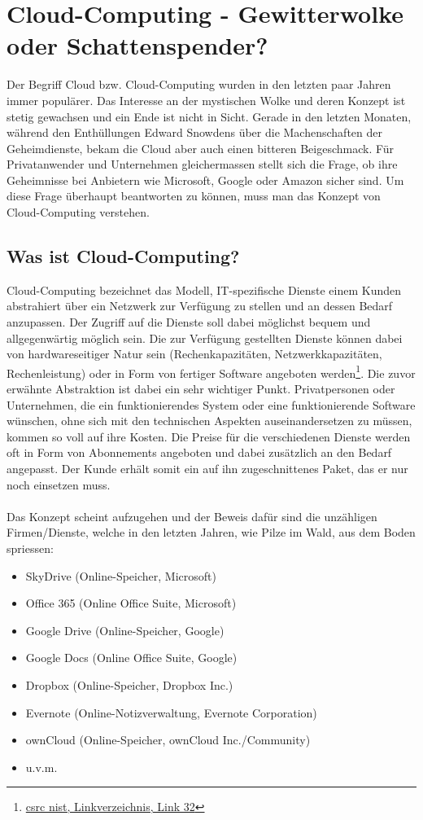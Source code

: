 \section{Cloud-Computing - Gewitterwolke oder Schattenspender?}
Der Begriff Cloud bzw. Cloud-Computing wurden in den letzten paar Jahren immer populärer. Das Interesse an der mystischen Wolke und deren Konzept ist stetig gewachsen und ein Ende ist nicht in Sicht. Gerade in den letzten Monaten, während den Enthüllungen Edward Snowdens über die Machenschaften der Geheimdienste, bekam die Cloud aber auch einen bitteren Beigeschmack. Für Privatanwender und Unternehmen gleichermassen stellt sich die Frage, ob ihre Geheimnisse bei Anbietern wie Microsoft, Google oder Amazon sicher sind. Um diese Frage überhaupt beantworten zu können, muss man das Konzept von Cloud-Computing verstehen.

\subsection{Was ist Cloud-Computing?}
Cloud-Computing bezeichnet das Modell, IT-spezifische Dienste einem Kunden abstrahiert über ein Netzwerk zur Verfügung zu stellen und an dessen Bedarf anzupassen. Der Zugriff auf die Dienste soll dabei möglichst bequem und allgegenwärtig möglich sein. Die zur Verfügung gestellten Dienste können dabei von hardwareseitiger Natur sein (Rechenkapazitäten, Netzwerkkapazitäten, Rechenleistung) oder in Form von fertiger Software angeboten werden\footnote{\hyperlink{link32}{csrc nist, Linkverzeichnis, Link 32}}.
Die zuvor erwähnte Abstraktion ist dabei ein sehr wichtiger Punkt. Privatpersonen oder Unternehmen, die ein funktionierendes System oder eine funktionierende Software wünschen, ohne sich mit den technischen Aspekten auseinandersetzen zu müssen, kommen so voll auf ihre Kosten. Die Preise für die verschiedenen Dienste werden oft in Form von Abonnements angeboten und dabei zusätzlich an den Bedarf angepasst. Der Kunde erhält somit ein auf ihn zugeschnittenes Paket, das er nur noch einsetzen muss.
\\
\\
Das Konzept scheint aufzugehen und der Beweis dafür sind die unzähligen Firmen/Dienste, welche in den letzten Jahren, wie Pilze im Wald, aus dem Boden spriessen:
\begin{itemize}
\item SkyDrive (Online-Speicher, Microsoft)
\item Office 365 (Online Office Suite, Microsoft)
\item Google Drive (Online-Speicher, Google)
\item Google Docs (Online Office Suite, Google)
\item Dropbox (Online-Speicher, Dropbox Inc.)
\item Evernote (Online-Notizverwaltung, Evernote Corporation)
\item ownCloud (Online-Speicher, ownCloud Inc./Community)
\item u.v.m.
\end{itemize}

